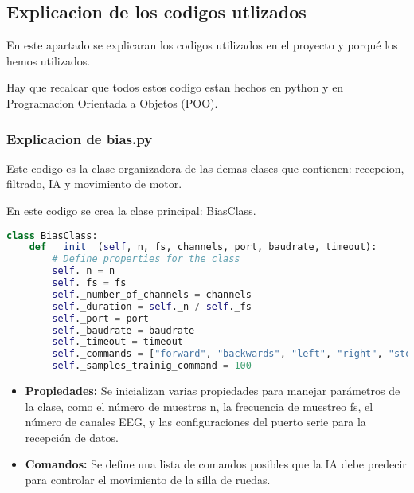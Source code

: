 \documentclass{article}
\begin{document}
\subsection{Explicacion de los codigos utlizados}
En este apartado se explicaran los codigos utilizados en el proyecto y porqué los hemos utilizados.

Hay que recalcar que todos estos codigo estan hechos en python y en Programacion Orientada a Objetos (POO).

\subsubsection{Explicacion de bias.py}
Este codigo es la clase organizadora de las demas clases que contienen: recepcion, filtrado, IA y movimiento de motor.

En este codigo se crea la clase principal: BiasClass.
\begin{lstlisting}[language=Python]
    class BiasClass:
    def __init__(self, n, fs, channels, port, baudrate, timeout):
        # Define properties for the class
        self._n = n
        self._fs = fs
        self._number_of_channels = channels
        self._duration = self._n / self._fs
        self._port = port
        self._baudrate = baudrate
        self._timeout = timeout
        self._commands = ["forward", "backwards", "left", "right", "stop", "rest"]
        self._samples_trainig_command = 100
\end{lstlisting}
\begin{itemize}
    \item \textbf{Propiedades:} Se inicializan varias propiedades para manejar parámetros de la clase, como el número de muestras n, la frecuencia de muestreo fs, el número de canales EEG, y las configuraciones del puerto serie para la recepción de datos.
    \item \textbf{Comandos:} Se define una lista de comandos posibles que la IA debe predecir para controlar el movimiento de la silla de ruedas.
\end{itemize}
\end{document}
